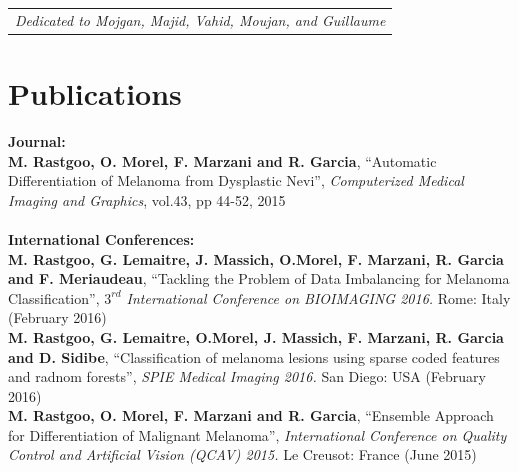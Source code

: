 \cleardoublepage



\newpage
\thispagestyle{empty}

\begin{flushright}
\begin{tabular}{l}
\textit{Dedicated to Mojgan, Majid, Vahid, Moujan, and Guillaume}
\end{tabular}
\end{flushright}

\cleardoublepage

\setcounter{page}{5} \pagestyle{plain}

\newpage
\thispagestyle{empty}
\chapter*{Publications}
\textbf{Journal:}\\
\noindent \textbf{M. Rastgoo, O. Morel, F. Marzani and R. Garcia}, ``Automatic Differentiation of Melanoma from Dysplastic Nevi'', \emph{Computerized Medical Imaging and Graphics}, vol.43, pp 44-52, 2015\\\\

\noindent \textbf{International Conferences:}\\
\noindent\textbf{M. Rastgoo, G. Lemaitre, J. Massich, O.Morel, F. Marzani, R. Garcia and F. Meriaudeau}, ``Tackling the Problem of Data Imbalancing for Melanoma Classification'', \emph{$3^{rd}$ International Conference on BIOIMAGING 2016.} Rome: Italy (February 2016)\\

\noindent\textbf{M. Rastgoo, G. Lemaitre, O.Morel, J. Massich, F. Marzani, R. Garcia and D. Sidibe}, ``Classification of melanoma lesions using sparse coded features and radnom forests'', \emph{SPIE Medical Imaging 2016.} San Diego: USA (February 2016)\\

\noindent\textbf{M. Rastgoo, O. Morel, F. Marzani and R. Garcia}, ``Ensemble Approach for Differentiation of Malignant Melanoma'', \emph{International Conference on Quality Control and Artificial Vision (QCAV) 2015.} Le Creusot: France (June 2015)\\


